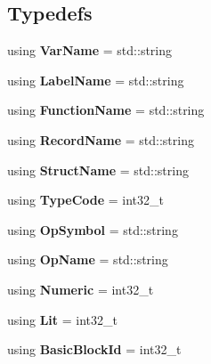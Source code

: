 \subsection*{Typedefs}
\begin{DoxyCompactItemize}
\item 
\mbox{\label{namespacespan_adc1e351442e4f323d37dbbb8736d003f}} 
using {\bfseries Var\+Name} = std\+::string
\item 
\mbox{\label{namespacespan_aca573765963a8edc25a3325832dce561}} 
using {\bfseries Label\+Name} = std\+::string
\item 
\mbox{\label{namespacespan_a5184c08609df37077d47e497f83aadd1}} 
using {\bfseries Function\+Name} = std\+::string
\item 
\mbox{\label{namespacespan_a556ddaab2ad6c39fb1d89fb38182fe57}} 
using {\bfseries Record\+Name} = std\+::string
\item 
\mbox{\label{namespacespan_a15c5b0a41f9b9cb79037a523191cca0b}} 
using {\bfseries Struct\+Name} = std\+::string
\item 
\mbox{\label{namespacespan_a3b705498a33775166ce714f0ea5a1da0}} 
using {\bfseries Type\+Code} = int32\+\_\+t
\item 
\mbox{\label{namespacespan_a5f1b256b3535269b460649c55d527f76}} 
using {\bfseries Op\+Symbol} = std\+::string
\item 
\mbox{\label{namespacespan_a775ca4493c61959fddf7cf9d9891209d}} 
using {\bfseries Op\+Name} = std\+::string
\item 
\mbox{\label{namespacespan_ad360fc1497775c98a644c3cf1c90597f}} 
using {\bfseries Numeric} = int32\+\_\+t
\item 
\mbox{\label{namespacespan_a33c8f3e16ea124bc2e8755a69f535397}} 
using {\bfseries Lit} = int32\+\_\+t
\item 
\mbox{\label{namespacespan_ab988dafbd25ab39838239b91d6a86214}} 
using {\bfseries Basic\+Block\+Id} = int32\+\_\+t

\end{DoxyCompactItemize}
